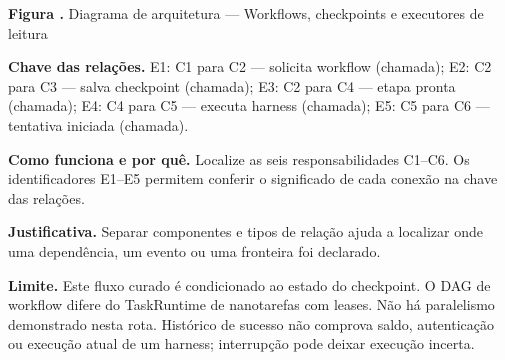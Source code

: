 {\small\textbf{Figura \thefigure.} Diagrama de arquitetura --- Workflows, checkpoints e executores de leitura}\par\smallskip
{\footnotesize\textbf{Chave das relações.} E1: C1 para C2 --- solicita workflow (chamada); E2: C2 para C3 --- salva checkpoint (chamada); E3: C2 para C4 --- etapa pronta (chamada); E4: C4 para C5 --- executa harness (chamada); E5: C5 para C6 --- tentativa iniciada (chamada).}\par\smallskip
\noindent\textbf{Como funciona e por quê.} Localize as seis responsabilidades C1--C6. Os identificadores E1--E5 permitem conferir o significado de cada conexão na chave das relações.\par
\noindent\textbf{Justificativa.} Separar componentes e tipos de relação ajuda a localizar onde uma dependência, um evento ou uma fronteira foi declarado.\par
\noindent\textbf{Limite.} Este fluxo curado é condicionado ao estado do checkpoint. O DAG de workflow difere do TaskRuntime de nanotarefas com leases. Não há paralelismo demonstrado nesta rota. Histórico de sucesso não comprova saldo, autenticação ou execução atual de um harness; interrupção pode deixar execução incerta.\par\smallskip
{}
